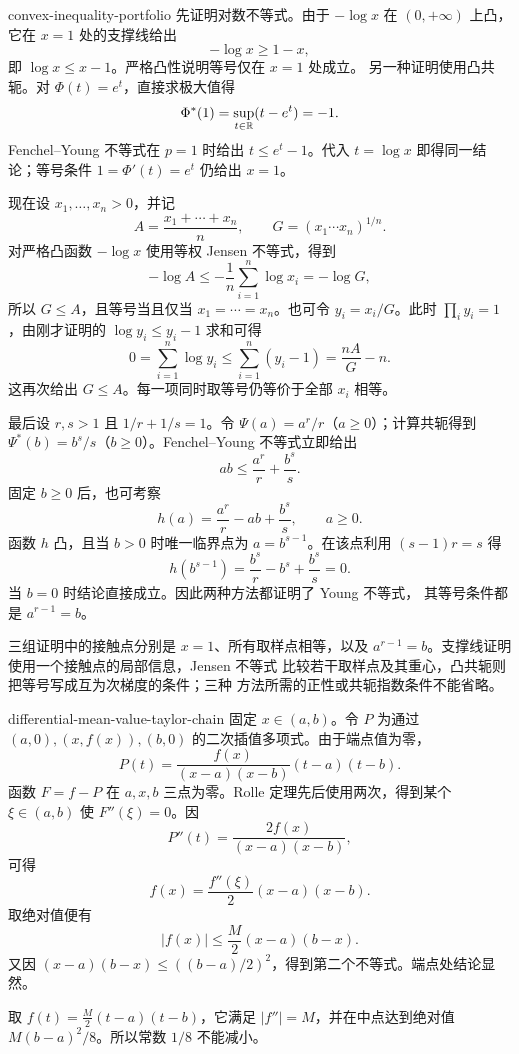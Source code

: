 \begin{solution}{convex-inequality-portfolio}
先证明对数不等式。由于 \(-\log x\) 在 \((0,+\infty)\) 上凸，
它在 \(x=1\) 处的支撑线给出
\[
 -\log x\ge 1-x,
\]
即 \(\log x\le x-1\)。严格凸性说明等号仅在 \(x=1\) 处成立。
另一种证明使用凸共轭。对 \(\Phi(t)=e^t\)，直接求极大值得
\[
 \Phi^*(1)=\sup_{t\in\mathbb{R}}(t-e^t)=-1.
\]
Fenchel--Young 不等式在 \(p=1\) 时给出 \(t\le e^t-1\)。代入
\(t=\log x\) 即得同一结论；等号条件 \(1=\Phi'(t)=e^t\) 仍给出
\(x=1\)。

现在设 \(x_1,\dots,x_n>0\)，并记
\[
 A=\frac{x_1+\cdots+x_n}{n},
 \qquad G=(x_1\cdots x_n)^{1/n}.
\]
对严格凸函数 \(-\log x\) 使用等权 Jensen 不等式，得到
\[
 -\log A\le-\frac1n\sum_{i=1}^n\log x_i=-\log G,
\]
所以 \(G\le A\)，且等号当且仅当 \(x_1=\cdots=x_n\)。也可令
\(y_i=x_i/G\)。此时 \(\prod_i y_i=1\)，由刚才证明的
\(\log y_i\le y_i-1\) 求和可得
\[
 0=\sum_{i=1}^n\log y_i
 \le\sum_{i=1}^n(y_i-1)
 =\frac{nA}{G}-n.
\]
这再次给出 \(G\le A\)。每一项同时取等号仍等价于全部 \(x_i\)
相等。

最后设 \(r,s>1\) 且 \(1/r+1/s=1\)。令
\(\Psi(a)=a^r/r\)（\(a\ge0\)）；计算共轭得到
\(\Psi^*(b)=b^s/s\)（\(b\ge0\)）。Fenchel--Young 不等式立即给出
\[
 ab\le\frac{a^r}{r}+\frac{b^s}{s}.
\]
固定 \(b\ge0\) 后，也可考察
\[
 h(a)=\frac{a^r}{r}-ab+\frac{b^s}{s},\qquad a\ge0.
\]
函数 \(h\) 凸，且当 \(b>0\) 时唯一临界点为
\(a=b^{s-1}\)。在该点利用 \((s-1)r=s\) 得
\[
 h(b^{s-1})
 =\frac{b^s}{r}-b^s+\frac{b^s}{s}=0.
\]
当 \(b=0\) 时结论直接成立。因此两种方法都证明了 Young 不等式，
其等号条件都是 \(a^{r-1}=b\)。

三组证明中的接触点分别是 \(x=1\)、所有取样点相等，以及
\(a^{r-1}=b\)。支撑线证明使用一个接触点的局部信息，Jensen 不等式
比较若干取样点及其重心，凸共轭则把等号写成互为次梯度的条件；三种
方法所需的正性或共轭指数条件不能省略。
\end{solution}

\begin{solution}{differential-mean-value-taylor-chain}
固定 \(x\in(a,b)\)。令 \(P\) 为通过 \((a,0),(x,f(x)),(b,0)\) 的二次插值多项式。由于端点值为零，
\[
 P(t)=\frac{f(x)}{(x-a)(x-b)}(t-a)(t-b).
\]
函数 \(F=f-P\) 在 \(a,x,b\) 三点为零。Rolle 定理先后使用两次，得到某个 \(\xi\in(a,b)\) 使 \(F''(\xi)=0\)。因
\[
 P''(t)=\frac{2f(x)}{(x-a)(x-b)},
\]
可得
\[
 f(x)=\frac{f''(\xi)}2(x-a)(x-b).
\]
取绝对值便有
\[
 |f(x)|\le\frac M2(x-a)(b-x).
\]
又因 \((x-a)(b-x)\le((b-a)/2)^2\)，得到第二个不等式。端点处结论显然。

取 \(f(t)=\frac M2(t-a)(t-b)\)，它满足 \(|f''|=M\)，并在中点达到绝对值 \(M(b-a)^2/8\)。所以常数 \(1/8\) 不能减小。
\end{solution}

